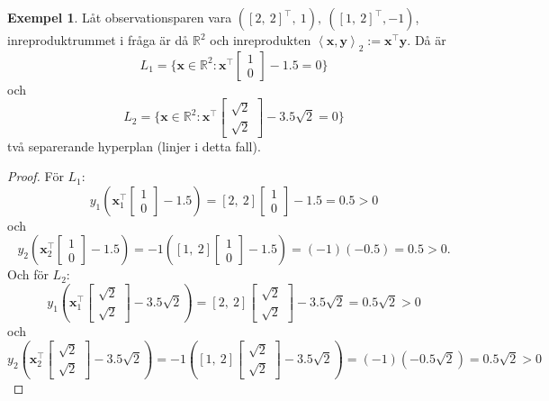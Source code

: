 \documentclass[a4paper, 12pt]{report}
\theoremstyle{definition}
\newtheorem{ex}{Exempel}[section]
\theoremstyle{remark}
\newcommand{\bfx}{\mathbf{x}}
\newcommand{\llangle}{\left\langle}
\newcommand{\rrangle}{\right\rangle}
\newcommand{\inner}[2]{\llangle #1, #2 \rrangle}
\begin{document}
\begin{ex}\label{exempel:mångahyperplan}
	Låt observationsparen vara $\left(\left[2,~2\right]^\intercal,~1\right),~\left(\left[1,~2\right]^\intercal,-1\right)$, inreproduktrummet i fråga är då $\mathbb{R}^2$ och inreprodukten $\inner{\bfx}{\mathbf{y}}_2:=\bfx^\intercal\mathbf{y}$. Då är $$L_1=\{\mathbf{x}\in\mathbb{R}^2: \mathbf{x}^\intercal\begin{bmatrix}
	1\\
	0
	\end{bmatrix} - 1.5=0\}$$ och $$L_2=\{\mathbf{x}\in\mathbb{R}^2: \mathbf{x}^\intercal\begin{bmatrix}
	\sqrt{2}\\
	\sqrt{2}
	\end{bmatrix} - 3.5\sqrt{2}=0\}$$ två separerande hyperplan (linjer i detta fall).
\end{ex}
\begin{proof}
	För $L_1$: $$y_1\left(\mathbf{x}_1^\intercal\begin{bmatrix}
	1\\
	0\end{bmatrix}-1.5\right)=\left[2,~2\right]\begin{bmatrix}
	1\\
	0\end{bmatrix}-1.5=0.5>0$$ och $$y_2\left(\mathbf{x}_2^\intercal\begin{bmatrix}
	1\\
	0\end{bmatrix}-1.5\right)=-1\left(\left[1,~2\right]\begin{bmatrix}
	1\\
	0\end{bmatrix}-1.5\right)=\left(-1\right)\left(-0.5\right)=0.5>0.$$
	Och för $L_2$: $$y_1\left(\mathbf{x}_1^\intercal\begin{bmatrix}
	\sqrt{2}\\
	\sqrt{2}\end{bmatrix}-3.5\sqrt{2}\right)=\left[2,~2\right]\begin{bmatrix}
	\sqrt{2}\\
	\sqrt{2}\end{bmatrix}-3.5\sqrt{2}=0.5\sqrt{2}>0$$ och $$y_2\left(\mathbf{x}_2^\intercal\begin{bmatrix}
	\sqrt{2}\\
	\sqrt{2}\end{bmatrix}-3.5\sqrt{2}\right)=-1\left(\left[1,~2\right]\begin{bmatrix}
	\sqrt{2}\\
	\sqrt{2}\end{bmatrix}-3.5\sqrt{2}\right)=\left(-1\right)\left(-0.5\sqrt{2}\right)=0.5\sqrt{2}>0$$
\end{proof}
\end{document}
